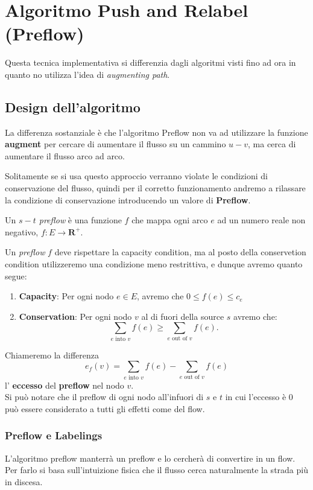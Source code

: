 \chapter{Algoritmo Push and Relabel (Preflow)}

Questa tecnica implementativa si differenzia dagli algoritmi visti fino ad ora in
quanto no utilizza l'idea di \textit{augmenting path}.

\section{Design dell'algoritmo}

La differenza sostanziale è che l'algoritmo Preflow non va ad utilizzare la funzione \textbf{augment} per cercare di aumentare il flusso su un cammino $u - v$, ma cerca di aumentare il flusso arco ad arco.

Solitamente se si usa questo approccio verranno violate le condizioni di conservazione del flusso, quindi per il corretto funzionamento andremo a rilassare la condizione di conservazione introducendo un valore di \textbf{Preflow}.

\begin{myblockquote}
	Un \textit{$s-t$ preflow } è una funzione $f$ che mappa ogni arco $e$ ad un numero reale non negativo, $f: E \rightarrow \mathbf{R^+}$.
\end{myblockquote}

Un \textit{preflow} $f$ deve rispettare la capacity condition, ma al posto della conservetion condition utilizzeremo una condizione meno restrittiva, e dunque avremo quanto segue:
\begin{enumerate}
	\item \textbf{Capacity}: Per ogni nodo $e \in E$, avremo che $0 \le f(e) \le c_e$
	\item \textbf{Conservation}: Per ogni nodo $v$ al di fuori della source $s$ avremo che:
	      $$
		      \sum_{e \text{ into }v}f(e) \ge \sum_{e \text{ out of }v}f(e).
	      $$
\end{enumerate}

Chiameremo la differenza
$$
	e_f(v) = \sum_{e \text{ into }v}f(e) - \sum_{e \text{ out of }v}f(e)
$$
l' \textbf{eccesso} del \textbf{preflow} nel nodo $v$.\\

Si può notare che il preflow di ogni nodo all'infuori di $s$ e $t$ in cui l'eccesso è 0 può essere considerato a tutti gli effetti come del flow.

\subsection{Preflow e Labelings}
L'algoritmo preflow manterrà un preflow e lo cercherà di convertire in un flow.
Per farlo si basa sull'intuizione fisica che il flusso cerca naturalmente la strada più in discesa.

